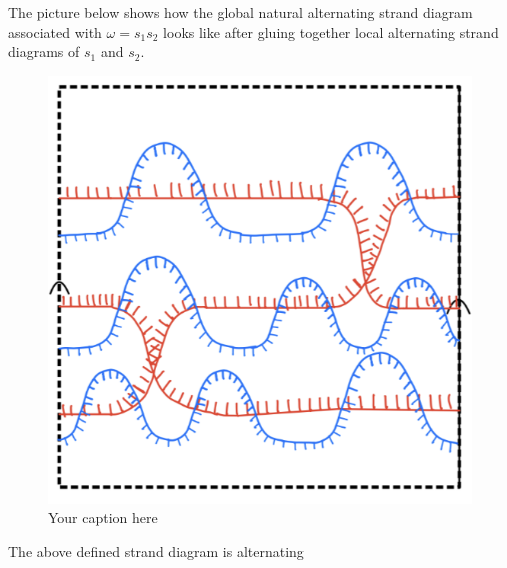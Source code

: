 The picture below shows how the global natural alternating strand diagram associated with $\omega = s_1 s_2$ looks like after gluing together local alternating strand diagrams of $s_1$ and $s_2$.

\begin{figure}[H] 
    \centering
    \includegraphics[scale = 0.95]{diagrams/natural_alternating_diagrams/10.png} 
    \caption{Your caption here}
    \label{fig:your-label}
\end{figure}

\begin{theorem}
The above defined strand diagram is alternating
\end{theorem}

